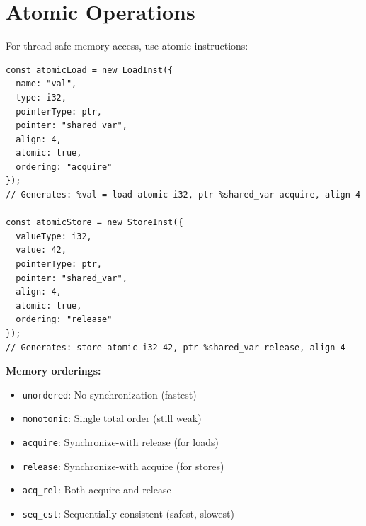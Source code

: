 \section{Atomic Operations}

For thread-safe memory access, use atomic instructions:

\begin{lstlisting}[style=ts]
const atomicLoad = new LoadInst({
  name: "val",
  type: i32,
  pointerType: ptr,
  pointer: "shared_var",
  align: 4,
  atomic: true,
  ordering: "acquire"
});
// Generates: %val = load atomic i32, ptr %shared_var acquire, align 4

const atomicStore = new StoreInst({
  valueType: i32,
  value: 42,
  pointerType: ptr,
  pointer: "shared_var",
  align: 4,
  atomic: true,
  ordering: "release"
});
// Generates: store atomic i32 42, ptr %shared_var release, align 4
\end{lstlisting}

\textbf{Memory orderings:}
\begin{itemize}[noitemsep]
  \item \texttt{unordered}: No synchronization (fastest)
  \item \texttt{monotonic}: Single total order (still weak)
  \item \texttt{acquire}: Synchronize-with release (for loads)
  \item \texttt{release}: Synchronize-with acquire (for stores)
  \item \texttt{acq\_rel}: Both acquire and release
  \item \texttt{seq\_cst}: Sequentially consistent (safest, slowest)
\end{itemize}

